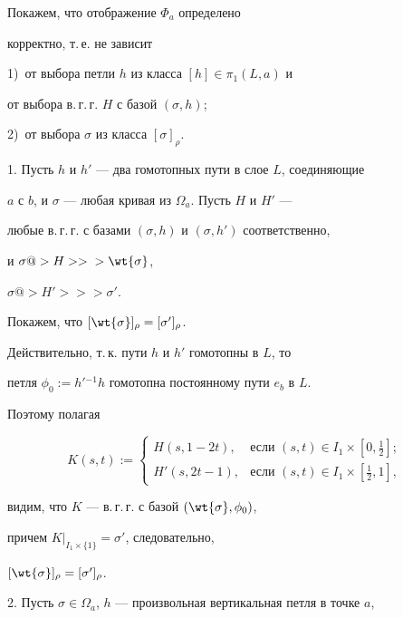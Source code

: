 \begin{pf}


Покажем, что отображение $\Phi_a$ определено


корректно, т.\,е. не зависит





1)~от выбора петли $h$ из класса $[h]\in \pi_1(L,a)$ и


от выбора в.\,г.\,г. $H$ с базой $(\sigma, h)$;





2)~от выбора $\sigma$ из класса $[\sigma]_{\rho}$.





1. Пусть $h$ и $h'$ --- два гомотопных пути в слое $L$, соединяющие


$a$ с $b$, и $\sigma$ --- любая кривая из $\Omega_a$. Пусть $H$ и $H'$ ---


любые в.\,г.\,г. с базами $(\sigma, h)$ и $(\sigma, h')$ соответственно,


и $\sigma@>H>>{} >\wt{\sigma}$,


$\sigma@> H'>> {}>\sigma'$.


Покажем, что $[\wt{\sigma}]_{\rho}=[\sigma']_{\rho}$.


Действительно, т.\,к. пути $h$ и $h'$ гомотопны в $L$, то


петля $\phi_0:=h'{}^{-1}h$ гомотопна постоянному пути $e_b$ в $L$.


Поэтому полагая


$$


K(s,t):=\begin{cases}


H(s,1-2t),& \text{если }(s,t)\in I_1\times [0,\frac{1}{2}];\\


H'(s, 2t-1),& \text{если }(s,t)\in I_1\times [\frac{1}{2},1],


\end{cases}


$$


видим, что $K$ --- в.\,г.\,г. с базой $(\wt{\sigma}, \phi_0)$,


причем $K|_{I_1\times\{1\}}=\sigma'$, следовательно,


$[\wt{\sigma}]_{\rho}=[\sigma']_{\rho}$.





2. Пусть $\sigma\in \Omega_a$, $h$ --- произвольная вертикальная петля в точке $a$,



\end{pf}
